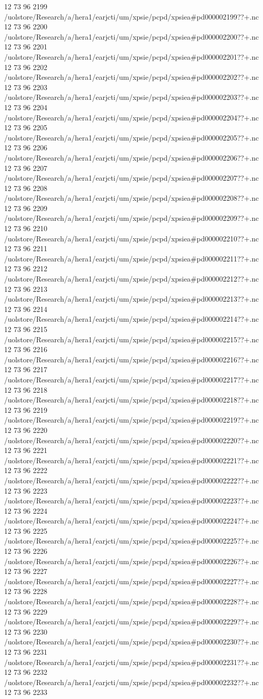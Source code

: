12 73 96
2199
/uolstore/Research/a/hera1/earjcti/um/xpsie/pcpd/xpsiea#pd000002199??+.nc
12 73 96
2200
/uolstore/Research/a/hera1/earjcti/um/xpsie/pcpd/xpsiea#pd000002200??+.nc
12 73 96
2201
/uolstore/Research/a/hera1/earjcti/um/xpsie/pcpd/xpsiea#pd000002201??+.nc
12 73 96
2202
/uolstore/Research/a/hera1/earjcti/um/xpsie/pcpd/xpsiea#pd000002202??+.nc
12 73 96
2203
/uolstore/Research/a/hera1/earjcti/um/xpsie/pcpd/xpsiea#pd000002203??+.nc
12 73 96
2204
/uolstore/Research/a/hera1/earjcti/um/xpsie/pcpd/xpsiea#pd000002204??+.nc
12 73 96
2205
/uolstore/Research/a/hera1/earjcti/um/xpsie/pcpd/xpsiea#pd000002205??+.nc
12 73 96
2206
/uolstore/Research/a/hera1/earjcti/um/xpsie/pcpd/xpsiea#pd000002206??+.nc
12 73 96
2207
/uolstore/Research/a/hera1/earjcti/um/xpsie/pcpd/xpsiea#pd000002207??+.nc
12 73 96
2208
/uolstore/Research/a/hera1/earjcti/um/xpsie/pcpd/xpsiea#pd000002208??+.nc
12 73 96
2209
/uolstore/Research/a/hera1/earjcti/um/xpsie/pcpd/xpsiea#pd000002209??+.nc
12 73 96
2210
/uolstore/Research/a/hera1/earjcti/um/xpsie/pcpd/xpsiea#pd000002210??+.nc
12 73 96
2211
/uolstore/Research/a/hera1/earjcti/um/xpsie/pcpd/xpsiea#pd000002211??+.nc
12 73 96
2212
/uolstore/Research/a/hera1/earjcti/um/xpsie/pcpd/xpsiea#pd000002212??+.nc
12 73 96
2213
/uolstore/Research/a/hera1/earjcti/um/xpsie/pcpd/xpsiea#pd000002213??+.nc
12 73 96
2214
/uolstore/Research/a/hera1/earjcti/um/xpsie/pcpd/xpsiea#pd000002214??+.nc
12 73 96
2215
/uolstore/Research/a/hera1/earjcti/um/xpsie/pcpd/xpsiea#pd000002215??+.nc
12 73 96
2216
/uolstore/Research/a/hera1/earjcti/um/xpsie/pcpd/xpsiea#pd000002216??+.nc
12 73 96
2217
/uolstore/Research/a/hera1/earjcti/um/xpsie/pcpd/xpsiea#pd000002217??+.nc
12 73 96
2218
/uolstore/Research/a/hera1/earjcti/um/xpsie/pcpd/xpsiea#pd000002218??+.nc
12 73 96
2219
/uolstore/Research/a/hera1/earjcti/um/xpsie/pcpd/xpsiea#pd000002219??+.nc
12 73 96
2220
/uolstore/Research/a/hera1/earjcti/um/xpsie/pcpd/xpsiea#pd000002220??+.nc
12 73 96
2221
/uolstore/Research/a/hera1/earjcti/um/xpsie/pcpd/xpsiea#pd000002221??+.nc
12 73 96
2222
/uolstore/Research/a/hera1/earjcti/um/xpsie/pcpd/xpsiea#pd000002222??+.nc
12 73 96
2223
/uolstore/Research/a/hera1/earjcti/um/xpsie/pcpd/xpsiea#pd000002223??+.nc
12 73 96
2224
/uolstore/Research/a/hera1/earjcti/um/xpsie/pcpd/xpsiea#pd000002224??+.nc
12 73 96
2225
/uolstore/Research/a/hera1/earjcti/um/xpsie/pcpd/xpsiea#pd000002225??+.nc
12 73 96
2226
/uolstore/Research/a/hera1/earjcti/um/xpsie/pcpd/xpsiea#pd000002226??+.nc
12 73 96
2227
/uolstore/Research/a/hera1/earjcti/um/xpsie/pcpd/xpsiea#pd000002227??+.nc
12 73 96
2228
/uolstore/Research/a/hera1/earjcti/um/xpsie/pcpd/xpsiea#pd000002228??+.nc
12 73 96
2229
/uolstore/Research/a/hera1/earjcti/um/xpsie/pcpd/xpsiea#pd000002229??+.nc
12 73 96
2230
/uolstore/Research/a/hera1/earjcti/um/xpsie/pcpd/xpsiea#pd000002230??+.nc
12 73 96
2231
/uolstore/Research/a/hera1/earjcti/um/xpsie/pcpd/xpsiea#pd000002231??+.nc
12 73 96
2232
/uolstore/Research/a/hera1/earjcti/um/xpsie/pcpd/xpsiea#pd000002232??+.nc
12 73 96
2233
